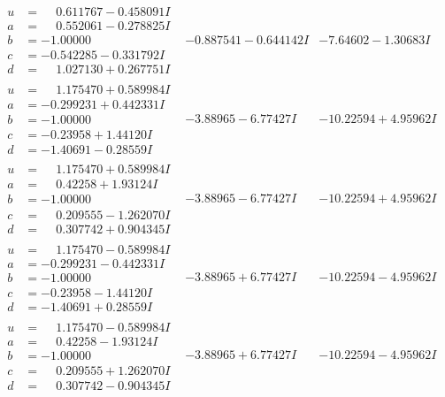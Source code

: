 \documentclass[1p]{elsarticle_modified}
\theoremstyle{definition}
\begin{document}
$$\begin{array}{c|c|c}
\begin{aligned}
u &= \phantom{-}0.611767 - 0.458091 I \\
a &= \phantom{-}0.552061 - 0.278825 I \\
b &= -1.00000\phantom{ +0.000000I} \\
c &= -0.542285 - 0.331792 I \\
d &= \phantom{-}1.027130 + 0.267751 I\end{aligned}
 & -0.887541 - 0.644142 I & -7.64602 - 1.30683 I \\ \hline\begin{aligned}
u &= \phantom{-}1.175470 + 0.589984 I \\
a &= -0.299231 + 0.442331 I \\
b &= -1.00000\phantom{ +0.000000I} \\
c &= -0.23958 + 1.44120 I \\
d &= -1.40691 - 0.28559 I\end{aligned}
 & -3.88965 - 6.77427 I & -10.22594 + 4.95962 I \\ \hline\begin{aligned}
u &= \phantom{-}1.175470 + 0.589984 I \\
a &= \phantom{-}0.42258 + 1.93124 I \\
b &= -1.00000\phantom{ +0.000000I} \\
c &= \phantom{-}0.209555 - 1.262070 I \\
d &= \phantom{-}0.307742 + 0.904345 I\end{aligned}
 & -3.88965 - 6.77427 I & -10.22594 + 4.95962 I \\ \hline\begin{aligned}
u &= \phantom{-}1.175470 - 0.589984 I \\
a &= -0.299231 - 0.442331 I \\
b &= -1.00000\phantom{ +0.000000I} \\
c &= -0.23958 - 1.44120 I \\
d &= -1.40691 + 0.28559 I\end{aligned}
 & -3.88965 + 6.77427 I & -10.22594 - 4.95962 I \\ \hline\begin{aligned}
u &= \phantom{-}1.175470 - 0.589984 I \\
a &= \phantom{-}0.42258 - 1.93124 I \\
b &= -1.00000\phantom{ +0.000000I} \\
c &= \phantom{-}0.209555 + 1.262070 I \\
d &= \phantom{-}0.307742 - 0.904345 I\end{aligned}
 & -3.88965 + 6.77427 I & -10.22594 - 4.95962 I\\

\end{array}$$
\end{document}
